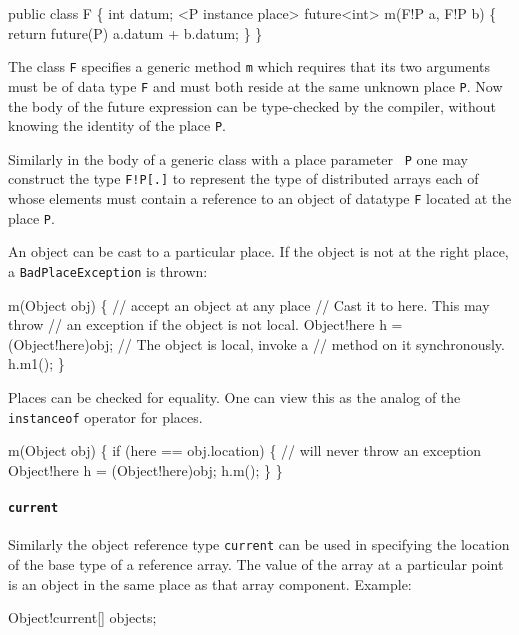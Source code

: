 \begin{x10}
public class F \{
  int datum;
  <P instance place> future<int> m(F!P a, F!P b) \{
    return future(P) {a.datum + b.datum;}
  \}
\}
\end{x10}
The class {\tt F} specifies a generic method {\tt m} which requires that 
its two arguments must be of data type {\tt F} and must both reside
at the same unknown place {\tt P}. Now the body of the {\cf future} expression
can be type-checked by the compiler, without knowing the identity 
of the place {\tt P}.

Similarly in the body of a generic class with a place parameter {\tt
P} one may construct the type {\tt F!P[.]} to represent the type of
distributed arrays each of whose elements must contain a reference to
an object of datatype {\tt F} located at the place {\tt P}.


An object can be cast to a particular place. If the object is not at
the right place, a {\tt BadPlaceException} is thrown:

\begin{x10}
m(Object obj) \{ // accept an object at any place
     // Cast it to here. This may throw
     // an exception if the object is not local.
     Object!here h = (Object!here)obj;
     // The object is local, invoke a
     // method on it synchronously.
     h.m1();
 \}
\end{x10}

Places can be checked for equality. One can view this as the analog of
the {\tt instanceof} operator for places.

\begin{x10}
m(Object obj) \{
    if (here == obj.location) \{
       // will never throw an exception
      Object!here h = (Object!here)obj;
      h.m();
   \}
\}
\end{x10}


\paragraph{{\tt current}}
Similarly the object reference type {\tt current} can be used in
specifying the location of the base type of a reference array. 
The value of the array at a particular point is an object in the
same place as that array component. Example:
\begin{x10}
    Object!current[] objects;
\end{x10}

